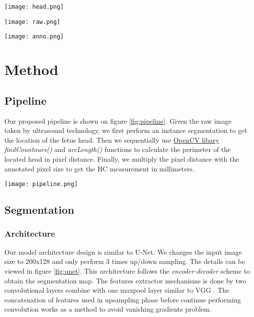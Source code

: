 \documentclass[conference]{IEEEtran}
\begin{document}
\begin{figure*}
    \centering
    \texttt{[image: head.png]}
    \caption{Train set csv file content}
    \label{fig:head}

    \texttt{[image: raw.png]}
    \caption{Raw ultrasound image}
    \label{fig:raw}
    
    \texttt{[image: anno.png]}
    \caption{Annotated HC image}
    \label{fig:anno}
\end{figure*}

\section{Method}
\subsection{Pipeline}
Our proposed pipeline is shown on figure \ref{fig:pipeline}. Given the raw image taken by ultrasound technology, we first perform an instance segmentation to get the location of the fetus head. Then we sequentially use \href{https://opencv.org/}{OpenCV libary} \emph{findCountours()} and \emph{arcLength()} functions to calculate the perimeter of the located head in pixel distance. Finally, we multiply the pixel distance with the annotated pixel size to get the HC measurement in millimeters.
\begin{figure*}
    \centering
    \texttt{[image: pipeline.png]}
    \caption{Proposed pipeline}
    \label{fig:pipeline}
\end{figure*}

\subsection{Segmentation}
\subsubsection{Architecture}
Our model architecture design is similar to U-Net\cite{Ronneberger2015}. We changes the input image size to 200x128 and only perform 3 times up/down sampling. The details can be viewed in figure \ref{fig:unet}. This architecture follows the \emph{encoder-decoder} scheme to obtain the segmentation map. The features extractor mechanisms is done by two convolutional layers combine with one maxpool layer similar to VGG \cite{Simonyan2015}. The concatenation of features used in upsampling phase before continue  performing convolution works as a method to avoid vanishing gradients problem.
\end{document}

